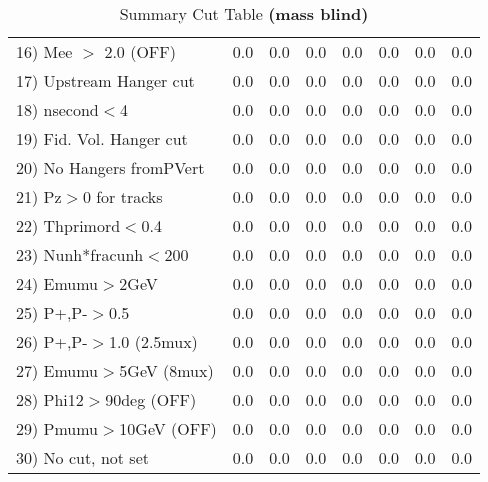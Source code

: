 \begin{table}[h!]
{{\begin{tabular}{||l||r|r|r|r|r||r||r||}
 16) Mee $>$ 2.0  (OFF)   &       0.0 &       0.0 &       0.0 &       0.0 &       0.0 &       0.0 &       0.0 \\
 17) Upstream Hanger cut  &       0.0 &       0.0 &       0.0 &       0.0 &       0.0 &       0.0 &       0.0 \\
 18) nsecond$<$4          &       0.0 &       0.0 &       0.0 &       0.0 &       0.0 &       0.0 &       0.0 \\
 19) Fid. Vol. Hanger cut &       0.0 &       0.0 &       0.0 &       0.0 &       0.0 &       0.0 &       0.0 \\
 20) No Hangers fromPVert &       0.0 &       0.0 &       0.0 &       0.0 &       0.0 &       0.0 &       0.0 \\
 21) Pz$>$0 for tracks    &       0.0 &       0.0 &       0.0 &       0.0 &       0.0 &       0.0 &       0.0 \\
 22) Thprimord$<$0.4      &       0.0 &       0.0 &       0.0 &       0.0 &       0.0 &       0.0 &       0.0 \\
 23) Nunh*fracunh$<$200   &       0.0 &       0.0 &       0.0 &       0.0 &       0.0 &       0.0 &       0.0 \\
 24) Emumu$>$2GeV         &       0.0 &       0.0 &       0.0 &       0.0 &       0.0 &       0.0 &       0.0 \\
 25) P+,P-$>$0.5          &       0.0 &       0.0 &       0.0 &       0.0 &       0.0 &       0.0 &       0.0 \\
 26) P+,P-$>$1.0 (2.5mux) &       0.0 &       0.0 &       0.0 &       0.0 &       0.0 &       0.0 &       0.0 \\
 27) Emumu$>$5GeV  (8mux) &       0.0 &       0.0 &       0.0 &       0.0 &       0.0 &       0.0 &       0.0 \\
 28) Phi12$>$90deg  (OFF) &       0.0 &       0.0 &       0.0 &       0.0 &       0.0 &       0.0 &       0.0 \\
 29) Pmumu$>$10GeV  (OFF) &       0.0 &       0.0 &       0.0 &       0.0 &       0.0 &       0.0 &       0.0 \\
 30) No cut, not set      &       0.0 &       0.0 &       0.0 &       0.0 &       0.0 &       0.0 &       0.0 \\
 \hline
 \hline
 \end{tabular}
 \caption{Summary Cut Table \textbf{ (mass blind)}}
 \label{tab-sumcut}
 }}
 \end{table}
 \endinput
